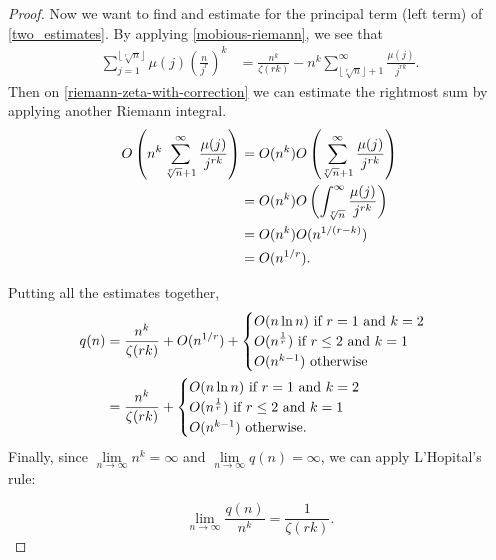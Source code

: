 \documentclass[10pt,a4paper]{article}
\theoremstyle{definition}
\theoremstyle{remark}
\begin{document}
\begin{proof}
	Now we want to find and estimate for the principal term (left term) of \cref{two_estimates}. By applying  \cref{mobious-riemann}, we see that
	\begin{align}\label{riemann-zeta-with-correction}
		\sum_{j=1}^{\lfloor\sqrt[r]{n}\rfloor}\mu(j)\left(\frac{n}{j^r}\right)^k &= \frac{n^k}{\zeta(rk)} - n^k\sum_{\lfloor \sqrt[r]{n} \rfloor + 1}^\infty \frac{\mu(j)}{j^{rk}}.
	\end{align}
	Then on \cref{riemann-zeta-with-correction} we can estimate the rightmost sum by applying another Riemann integral. 
	\begin{align}
		O\left(n^k\sum_{\sqrt[r]{n}+1}^\infty \frac{\mu(j)}{j^{rk}}\right) &= O(n^k)O\left(\sum_{\sqrt[r]{n}+1}^\infty \frac{\mu(j)}{j^{rk}}\right)\notag\\
		&= O(n^k)O\left(\int_{\sqrt[r]{n}}^{\infty}\frac{\mu(j)}{j^{rk}}\right)\notag\\
		&=O(n^k)O(n^{{1}/(r-k)})\notag\\
		&=O(n^{{1}/r}).
	\end{align} 

	Putting all the estimates together, 
	\begin{align}
		q(n) &= \frac{n^k}{\zeta(rk)}+O(n^{{1}/r})+ \begin{cases}
			O(n\ln n) \text{ if } r=1 \text{ and } k=2\\
			O(n^{\frac{1}{r}}) \text{ if } r\leq 2 \text{ and } k=1\\
			O(n^{k-1}) \text{ otherwise}\end{cases}\notag\\
		&= \frac{n^k}{\zeta(rk)}+ \begin{cases}
			O(n\ln n) \text{ if } r=1 \text{ and } k=2\\
			O(n^{\frac{1}{r}}) \text{ if } r\leq 2 \text{ and } k=1\\
			O(n^{k-1}) \text{ otherwise.}\end{cases}
	\end{align}
	Finally, since \(\lim\limits_{n\to\infty} n^k = \infty\) and \(\lim\limits_{n\to\infty} q(n)=\infty\), we can apply L'Hopital's rule:
	
	\begin{equation}
		\lim\limits_{n\to\infty} \frac{q(n)}{n^k} = \frac{1}{\zeta(rk)}.
	\end{equation}
\end{proof}

\end{document}
